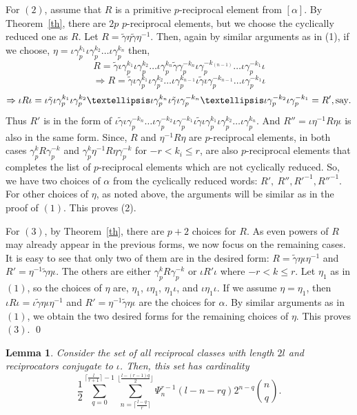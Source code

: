 \documentclass[11pt]{amsart}
\renewenvironment{proof}{{\bfseries Proof.}}{\qed}
\numberwithin{equation}{section}
\newtheorem{lemma}[theorem]{Lemma}
\theoremstyle{definition}
\newcommand{\gt}{\tilde{\gamma}}
\newcommand{\imp}{\Rightarrow}
\newcommand{\g}{\gamma_{p}}
\newcommand{\io}{\iota }
\newcommand{\thmref}[1]{Theorem~\ref{#1}}
\numberwithin{equation}{section}
\begin{document}
\begin{proof}
		
		For $(2)$, assume that $R$ is a primitive  $p$-reciprocal element from $[\alpha].$ By \thmref {th}, there are $2p$ $p$-reciprocal elements, but we choose the cyclically reduced one as $R$. Let $R=\gt\eta \gt\eta^{-1}$.  Then, again by similar arguments as  in (1), if we choose, $ \eta= \io\g^{k_{1}}\io\g^{k_{2}}\dots \io\g^{k_{n}}$ then, 
		\[R=\gt \io\g^{k_{1}}\io\g^{k_{2}}\dots \io\g^{k_{n}}\gt \g^{-k_{n}}\io\g^{-k_{(n-1)}}\dots \io\g^{-k_{1}}\io\]
		\[\imp R=\gt \io\g^{k_{1}}\io\g^{k_{2}}\dots \io \g^{k_{n-1}}\io\gt\io\g^{-k_{n-1}}\dots \io\g^{-k_{1}}\io\]  
		\[\imp \io R\io =  \io \gt\io \g^{k_{1}}\io \g^{k_{2}}\dots \io \g^{k_{n}}\io \gt\io \g^{-k_{n}}\dots\io \g^{-k_{2}}\io \g^{-k_{1}}=R', \hbox{say}.\]	Thus  $R'$ is in the form of $\io \gt\io \g^{-k_{n}}\dots\io \g^{-k_{2}}\io \g^{-k_{1}} \io \gt\io \g^{k_{1}}\io \g^{k_{2}}\dots \io \g^{k_{n}}  $.  And $R''= \io\eta^{-1} R\eta \io$ is also in the same form. Since, $R$ and $\eta^{-1}R\eta$ are $ p $-reciprocal elements, in both cases $ \g^{k}R\g^{-k} $ and $ \g^{k} \eta^{-1}R\eta\g^{-k} $  for $-r<k_i\leq r$, are also $ p $-reciprocal elements that completes the list of $ p $-reciprocal elements which are not cyclically reduced. So, we have two choices of $\alpha$ from the cyclically reduced words:  $ R' , ~R'',R'^{-1}, R''^{-1}$. For other choices of $\eta$, as noted above,  the arguments will be similar as in the proof of $(1)$. This proves (2).
		
		For $(3)$, by \thmref{th}, there are $p+2$ choices for $R$. As even powers of 
		$R$ may already appear in the previous forms, we now focus on the remaining cases.  It is easy to see that only two of them are in the desired form:  $ R=\gt\eta\io \eta^{-1} $  and $ R'=\eta^{-1}\gt \eta \io.$ The  others are either $ \g^{k}R\g^{-k} $ or $\io R'\io$ where $-r<k\leq r$. Let $\eta_1$ as  in  $(1)$, so the choices of $\eta$ are, $\eta_1$, $\io\eta_1$, $\eta_1 \io$, and $\io\eta_1\io$.  
		If we assume $\eta=\eta_1$, then $\io R\io= \io\gt\eta\io\eta^{-1} $ and $R'=\eta^{-1}\gt\eta\io $ are the choices for $\alpha$. 
		By similar arguments as in  $ (1) $, we obtain the two desired forms for the remaining choices of $\eta$. This proves $(3)$.
	\end{proof}
	\begin{lemma}
		Consider the set of all reciprocal classes with length $2l$ and reciprocators conjugate to $\iota$. Then, this set has cardinality
		$$\frac{1}{2}\sum_{q=0}^{\lceil\frac{l}{r+1}\rceil-1} \sum_{n= \lceil\frac{l-q}{r}\rceil }^{\lfloor \frac{l-(r-1)q}{2}\rfloor}\Psi_{n}^{r-1}(l-n-rq)2^{n-q} {n \choose q}.$$ 
	\end{lemma}
\end{document}
